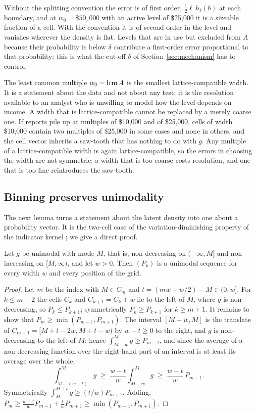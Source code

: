 Without the splitting convention the error is of first order, $\tfrac12\ell\,h_\ell(b)$ at each boundary, and at $w_0=\$50{,}000$ with an active level of \$25{,}000 it is a sizeable fraction of a cell. With the convention it is of second order in the level and vanishes wherever the density is flat. Levels that are in use but excluded from $A$ because their probability is below $\delta$ contribute a first-order error proportional to that probability; this is what the cut-off $\delta$ of Section~\ref{sec:mechanism} has to control.

The least common multiple $w_0=\operatorname{lcm} A$ is the smallest lattice-compatible width. It is a statement about the data and not about any test: it is the resolution available to an analyst who is unwilling to model how the level depends on income. A width that is lattice-compatible cannot be replaced by a merely coarse one. If reports pile up at multiples of \$10{,}000 and of \$25{,}000, cells of width \$10{,}000 contain two multiples of \$25{,}000 in some cases and none in others, and the cell vector inherits a saw-tooth that has nothing to do with $g$. Any multiple of a lattice-compatible width is again lattice-compatible, so the errors in choosing the width are not symmetric: a width that is too coarse costs resolution, and one that is too fine reintroduces the saw-tooth.

\subsection{Binning preserves unimodality}

The next lemma turns a statement about the latent density into one about a probability vector. It is the two-cell case of the variation-diminishing property of the indicator kernel \citep{Karlin1968}; we give a direct proof.

\begin{lemma}\label{lem:binning}
Let $g$ be unimodal with mode $M$, that is, non-decreasing on $(-\infty,M]$ and non-increasing on $[M,\infty)$, and let $w>0$. Then $(P_k)$ is a unimodal sequence for every width $w$ and every position of the grid.
\end{lemma}

\begin{proof}
Let $m$ be the index with $M\in C_m$ and $t=(mw+w/2)-M\in(0,w]$. For $k\le m-2$ the cells $C_k$ and $C_{k+1}=C_k+w$ lie to the left of $M$, where $g$ is non-decreasing, so $P_k\le P_{k+1}$; symmetrically $P_k\ge P_{k+1}$ for $k\ge m+1$. It remains to show that $P_m\ge\min(P_{m-1},P_{m+1})$. The interval $[M-w,M]$ is the translate of $C_{m-1}=[M+t-2w,M+t-w)$ by $w-t\ge0$ to the right, and $g$ is non-decreasing to the left of $M$; hence $\int_{M-w}^Mg\ge P_{m-1}$, and since the average of a non-decreasing function over the right-hand part of an interval is at least its average over the whole,
\[
\int_{M-(w-t)}^{M}g\;\ge\;\frac{w-t}{w}\int_{M-w}^{M}g\;\ge\;\frac{w-t}{w}\,P_{m-1}.
\]
Symmetrically $\int_M^{M+t}g\ge (t/w)P_{m+1}$. Adding, $P_m\ge\frac{w-t}{w}P_{m-1}+\frac twP_{m+1}\ge\min(P_{m-1},P_{m+1})$.
\end{proof}

